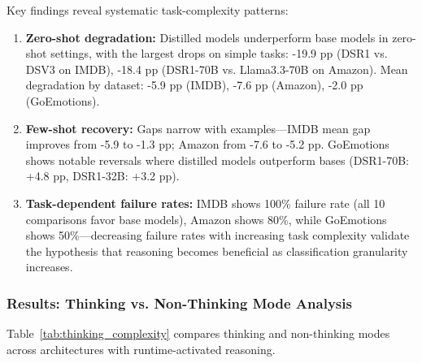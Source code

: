 Key findings reveal systematic task-complexity patterns:

\begin{enumerate}[leftmargin=*]
    \item \textbf{Zero-shot degradation:} Distilled models underperform base models in zero-shot settings, with the largest drops on simple tasks: -19.9 pp (DSR1 vs. DSV3 on IMDB), -18.4 pp (DSR1-70B vs. Llama3.3-70B on Amazon). Mean degradation by dataset: -5.9 pp (IMDB), -7.6 pp (Amazon), -2.0 pp (GoEmotions).
    
    \item \textbf{Few-shot recovery:} Gaps narrow with examples---IMDB mean gap improves from -5.9 to -1.3 pp; Amazon from -7.6 to -5.2 pp. GoEmotions shows notable reversals where distilled models outperform bases (DSR1-70B: +4.8 pp, DSR1-32B: +3.2 pp).
    
    \item \textbf{Task-dependent failure rates:} IMDB shows 100\% failure rate (all 10 comparisons favor base models), Amazon shows 80\%, while GoEmotions shows 50\%---decreasing failure rates with increasing task complexity validate the hypothesis that reasoning becomes beneficial as classification granularity increases.
\end{enumerate}

\subsubsection{Results: Thinking vs. Non-Thinking Mode Analysis}

Table~\ref{tab:thinking_complexity} compares thinking and non-thinking modes across architectures with runtime-activated reasoning.

